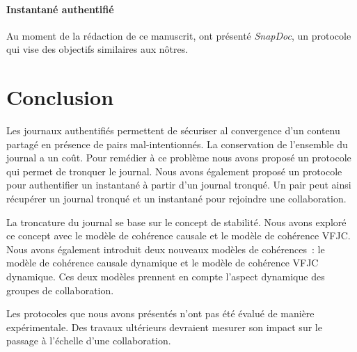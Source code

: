 \paragraph{Instantané authentifié} Au moment de la rédaction de ce manuscrit, \textcite{kollmann2019_snapdoc} ont présenté \emph{SnapDoc}, un protocole qui vise des objectifs similaires aux nôtres.


\section{Conclusion}

Les journaux authentifiés permettent de sécuriser al convergence d'un contenu partagé en présence de pairs mal-intentionnés.
La conservation de l'ensemble du journal a un coût.
Pour remédier à ce problème nous avons proposé un protocole qui permet de tronquer le journal.
Nous avons également proposé un protocole pour authentifier un instantané à partir d'un journal tronqué.
Un pair peut ainsi récupérer un journal tronqué et un instantané pour rejoindre une collaboration.

La troncature du journal se base sur le concept de stabilité.
Nous avons exploré ce concept avec le modèle de cohérence causale et le modèle de cohérence \ac{VFJC}.
Nous avons également introduit deux nouveaux modèles de cohérences~: le modèle de cohérence causale dynamique et le modèle de cohérence \ac{VFJC} dynamique.
Ces deux modèles prennent en compte l'aspect dynamique des groupes de collaboration.

Les protocoles que nous avons présentés n'ont pas été évalué de manière expérimentale.
Des travaux ultérieurs devraient mesurer son impact sur le passage à l'échelle d'une collaboration.
